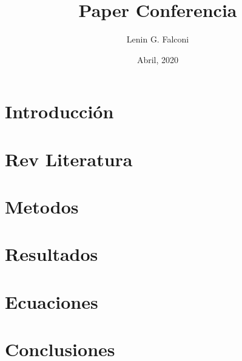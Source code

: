 \documentclass[12pt]{report} %
\title{Paper                 Conferencia}
\author{Lenin G. Falconi }
\date{Abril, 2020}
\begin{document}
\maketitle
\tableofcontents
\listoffigures

\listoftables


\chapter{Introducción}
\label{cap:Cap1}

\chapter{Rev Literatura}
\label{cap:Cap2}

\chapter{Metodos}
\label{cap:Cap3}


\chapter{Resultados}
\label{cap:Cap4}


\chapter{Ecuaciones}
\label{cap:Cap5}


\chapter{Conclusiones}
\label{cap:Cap6}





\printbibliography[title={Bibliografía}]
\end{document}
